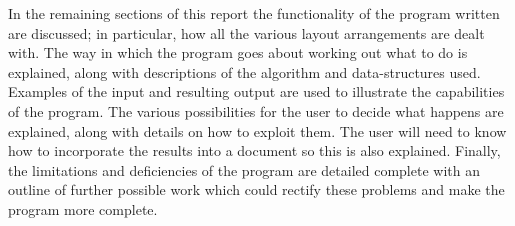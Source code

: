 In the remaining sections of this report the functionality of the program written
are discussed; in particular, how all the various layout arrangements are dealt with.  The way
in which the program goes about working out what to do is explained,
along with descriptions of the algorithm and data-structures used.  Examples
of the input and resulting output are used to illustrate the capabilities
of the program.  The various possibilities for the user to decide what happens
are explained, along with details on how to exploit them.  The user will
need to know how to incorporate the results into a document so this
is also explained.  Finally, the limitations and deficiencies of the
program are detailed complete with an outline of further possible work
which could rectify these problems and make the program more complete.
